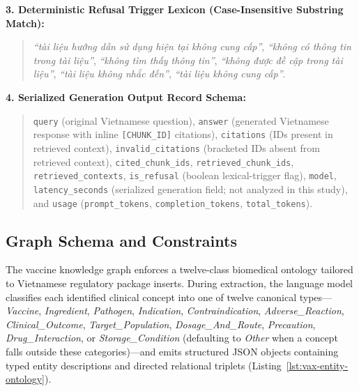 \documentclass[sn-mathphys, oneside]{sn-jnl}
\newcommand{\vn}[1]{{\fontencoding{T5}\selectfont #1}}
\begin{document}
\begin{tcolorbox}[colback=white,colframe=black!65,boxrule=0.6pt,arc=0pt,left=8pt,right=8pt,top=8pt,bottom=8pt]
\textbf{3. Deterministic Refusal Trigger Lexicon (Case-Insensitive Substring Match):}
\begin{quote}
\emph{\vn{``tài liệu hướng dẫn sử dụng hiện tại không cung cấp''}}, \emph{\vn{``không có thông tin trong tài liệu''}}, \emph{\vn{``không tìm thấy thông tin''}}, \emph{\vn{``không được đề cập trong tài liệu''}}, \emph{\vn{``tài liệu không nhắc đến''}}, \emph{\vn{``tài liệu không cung cấp''}}.
\end{quote}

\textbf{4. Serialized Generation Output Record Schema:}
\begin{quote}
\texttt{query} (original Vietnamese question), \texttt{answer} (generated Vietnamese response with inline \texttt{[CHUNK\_ID]} citations), \texttt{citations} (IDs present in retrieved context), \texttt{invalid\_citations} (bracketed IDs absent from retrieved context), \texttt{cited\_chunk\_ids}, \texttt{retrieved\_chunk\_ids}, \texttt{retrieved\_contexts}, \texttt{is\_refusal} (boolean lexical-trigger flag), \texttt{model}, \texttt{latency\_seconds} (serialized generation field; not analyzed in this study), and \texttt{usage} (\texttt{prompt\_tokens}, \texttt{completion\_tokens}, \texttt{total\_tokens}).
\end{quote}
\end{tcolorbox}

\subsection{Graph Schema and Constraints}
\label{app:graph_schema}
The vaccine knowledge graph enforces a twelve-class biomedical ontology tailored to Vietnamese regulatory package inserts. During extraction, the language model classifies each identified clinical concept into one of twelve canonical types—\emph{Vaccine}, \emph{Ingredient}, \emph{Pathogen}, \emph{Indication}, \emph{Contraindication}, \emph{Adverse\_Reaction}, \emph{Clinical\_Outcome}, \emph{Target\_Population}, \emph{Dosage\_And\_Route}, \emph{Precaution}, \emph{Drug\_Interaction}, or \emph{Storage\_Condition} (defaulting to \emph{Other} when a concept falls outside these categories)—and emits structured JSON objects containing typed entity descriptions and directed relational triplets (Listing~\ref{lst:vax-entity-ontology}).
\end{document}
